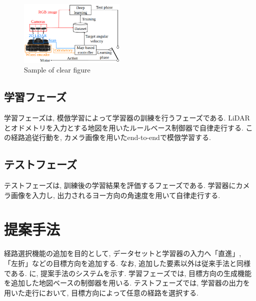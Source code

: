 \documentclass[10pt]{jarticle}
\begin{document}
    \begin{center}
        \begin{figure}[!b]
            \includegraphics[width=0.45\textwidth]{./fig/convsys.png}
            \caption{Sample of clear figure}
            \label{fig:sample-fig}
        \end{figure}
    \end{center}

    
    \subsection{学習フェーズ}
    
    学習フェーズは, 模倣学習によって学習器の訓練を行うフェーズである. LiDARとオドメトリを入力とする地図を用いたルールベース制御器で自律走行する. この経路追従行動を, カメラ画像を用いたend-to-endで模倣学習する.

    \subsection{テストフェーズ}

    テストフェーズは, 訓練後の学習結果を評価するフェーズである. 学習器にカメラ画像を入力し, 出力されるヨー方向の角速度を用いて自律走行する.

    \section{提案手法}

    経路選択機能の追加を目的として, データセットと学習器の入力へ「直進」, 「左折」などの目標方向を追加する. なお, 追加した要素以外は従来手法と同様である. に, 提案手法のシステムを示す. 学習フェーズでは, 目標方向の生成機能を追加した地図ベースの制御器を用いる. テストフェーズでは, 学習器の出力を用いた走行において, 目標方向によって任意の経路を選択する.
    

\end{document}

